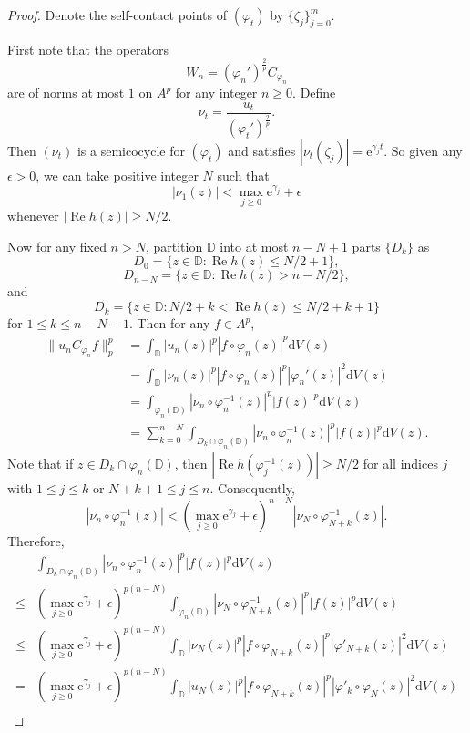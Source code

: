 \documentclass{amsart}
\theoremstyle{proclaim}
\theoremstyle{fancyproclaim}
\theoremstyle{definition}
\theoremstyle{fancystatement}
\numberwithin{equation}{section}
\begin{document}
\begin{proof}
Denote the self-contact points of $(\varphi_t)$ by $\{\zeta_j\}_{j=0}^m$.

First note that the operators 
$$W_n=(\varphi_n')^{\frac{2}{p}}C_{\varphi_n}$$ 
are of norms at most $1$ on $A^p$ for any integer $n\geq0$. Define
$$\nu_t=\frac{u_t}{ (\varphi_t')^{\frac{2}{p}}}.$$
Then $(\nu_t)$ is a semicocycle for $(\varphi_t)$ and satisfies $|\nu_t(\zeta_j)|= \mathrm{e}^{\gamma_j t}$. So given any $\epsilon>0$, we can take positive integer $N$ such that 
$$|\nu_1(z)|<\max_{j\geq0} \mathrm{e}^{\gamma_j}+\epsilon$$ 
whenever $|\operatorname{Re}h(z)|\geq N/2$.

Now for any fixed $n>N$, partition $\mathbb{D}$ into at most $n-N+1$ parts $\{D_k\}$ as 
$$D_0=\{z\in\mathbb{D} :  \operatorname{Re}h(z)\leq N/2+1\},$$
$$D_{n-N}=\{z\in\mathbb{D} :  \operatorname{Re}h(z)>n- N/2\},$$
and
$$D_k=\{z\in\mathbb{D} : N/2+k< \operatorname{Re}h(z)\leq N/2+k+1\}$$
for $1\leq k\leq n-N-1$. Then for any $f\in A^p$,
\begin{align*}
\|u_nC_{\varphi_n}f\|_p^p&=\int_{\mathbb{D}}|u_n(z)|^p  |f\circ\varphi_n(z)|^p \mathrm{d}V(z)\\
&=\int_{\mathbb{D}}|\nu_n(z)|^p  |f\circ\varphi_n(z)|^p  |\varphi_n'(z)|^2 \mathrm{d}V(z)\\
&=\int_{\varphi_n(\mathbb{D})}|\nu_n\circ\varphi_n^{-1}(z)|^p  |f(z)|^p \mathrm{d}V(z)\\
&=\sum_{k=0}^{n-N}\int_{D_k\cap\varphi_n(\mathbb{D})}|\nu_n\circ\varphi_n^{-1}(z)|^p  |f(z)|^p \mathrm{d}V(z).
\end{align*}
Note that if $z\in D_k\cap\varphi_n(\mathbb{D})$, then $|\operatorname{Re}h(\varphi_j^{-1}(z))|\geq N/2$ for all indices $j$ with $1\leq j\leq k$ or $N+k+1\leq j\leq n$. Consequently,
$$|\nu_n\circ\varphi_n^{-1}(z)|<\left(\max_{j\geq0} \mathrm{e}^{\gamma_j}+\epsilon\right)^{n-N} |\nu_N\circ\varphi^{-1}_{N+k}(z)|.$$
Therefore, 
\begin{align*}
&\int_{D_k\cap\varphi_n(\mathbb{D})}|\nu_n\circ\varphi_n^{-1}(z)|^p  |f(z)|^p \mathrm{d}V(z)\\
\leq&\left(\max_{j\geq0} \mathrm{e}^{\gamma_j}+\epsilon\right)^{p(n-N)} \int_{\varphi_n(\mathbb{D})}|\nu_N\circ\varphi_{N+k}^{-1}(z)|^p  |f(z)|^p \mathrm{d}V(z)\\
\leq&\left(\max_{j\geq0} \mathrm{e}^{\gamma_j}+\epsilon\right)^{p(n-N)} \int_{\mathbb{D}}|\nu_N(z)|^p  |f\circ\varphi_{N+k}(z)|^p  |\varphi'_{N+k}(z)|^2 \mathrm{d}V(z)\\
=&\left(\max_{j\geq0} \mathrm{e}^{\gamma_j}+\epsilon\right)^{p(n-N)} \int_{\mathbb{D}}|u_N(z)|^p  |f\circ\varphi_{N+k}(z)|^p  |\varphi'_k\circ\varphi_N(z)|^2 \mathrm{d}V(z)\\

\end{align*}
\end{proof}
\end{document}
